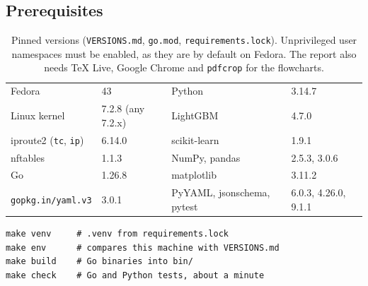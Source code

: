\documentclass[11pt,a4paper]{article}
\begin{document}
\subsection*{Prerequisites}
\begin{table}[H]\centering\small
\begin{tabular}{@{}ll@{\hspace{2em}}ll@{}}
\toprule
Fedora & 43 & Python & 3.14.7 \\
Linux kernel & 7.2.8 (any 7.2.x) & LightGBM & 4.7.0 \\
iproute2 (\texttt{tc}, \texttt{ip}) & 6.14.0 & scikit-learn & 1.9.1 \\
nftables & 1.1.3 & NumPy, pandas & 2.5.3, 3.0.6 \\
Go & 1.26.8 & matplotlib & 3.11.2 \\
\texttt{gopkg.in/yaml.v3} & 3.0.1 & PyYAML, jsonschema, pytest & 6.0.3, 4.26.0, 9.1.1 \\
\bottomrule
\end{tabular}
\caption{Pinned versions (\texttt{VERSIONS.md}, \texttt{go.mod}, \texttt{requirements.lock}). Unprivileged user namespaces must be enabled, as they are by default on Fedora. The report also needs TeX Live, Google Chrome and \texttt{pdfcrop} for the flowcharts.}
\end{table}
\begin{verbatim}
make venv     # .venv from requirements.lock
make env      # compares this machine with VERSIONS.md
make build    # Go binaries into bin/
make check    # Go and Python tests, about a minute
\end{verbatim}
\end{document}
